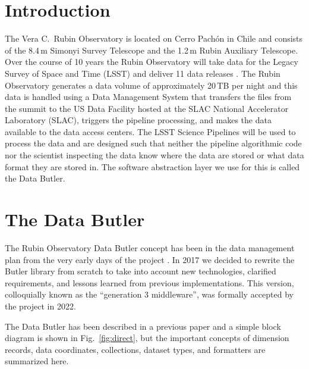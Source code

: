 \section{Introduction}

The Vera C.\ Rubin Observatory is located on Cerro Pach\'{o}n in Chile and consists of the 8.4\,m Simonyi Survey Telescope and the 1.2\,m Rubin Auxiliary Telescope.
Over the course of 10 years the Rubin Observatory will take data for the Legacy Survey of Space and Time (LSST) and deliver 11 data releases \cite{2019ApJ...873..111I}.
The Rubin Observatory generates a data volume of approximately 20\,TB per night and this data is handled using a Data Management System \cite{2022arXiv221113611O} that transfers the files from the summit to the US Data Facility hosted at the SLAC National Accelerator Laboratory (SLAC), triggers the pipeline processing, and makes the data available to the data access centers.
The LSST Science Pipelines \cite{2019ASPC..523..521B} will be used to process the data and are designed such that neither the pipeline algorithmic code nor the scientist inspecting the data know where the data are stored or what data format they are stored in.
The software abstraction layer we use for this is called the Data Butler. \cite{2019ASPC..523..653J,2022SPIE12189E..11J}

\section{The Data Butler}

The Rubin Observatory Data Butler concept has been in the data management plan from the very early days of the project \cite{2007ASPC..376....3K,2010SPIE.7740E..15A}.
In 2017 \cite{LDM-563} we decided to rewrite the Butler library from scratch to take into account new technologies, clarified requirements, \cite{LDM-556} and lessons learned from previous implementations.
This version, colloquially known as the ``generation 3 middleware'', was formally accepted by the project in 2022. \cite{DMTR-271}

The Data Butler has been described in a previous paper \cite{2022SPIE12189E..11J} and a simple block diagram is shown in Fig.~\ref{fig:direct}, but the important concepts of dimension records, data coordinates, collections, dataset types, and formatters are summarized here.

